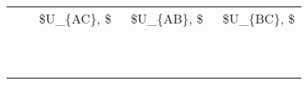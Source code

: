 \documentclass{article}
\begin{document}
\begin{table}[h!]
\begin{tabular}{llll}

\multicolumn{1}{p{114.4275pt}}{\centering } & \multicolumn{1}{p{70.76437pt}}{\centering \ \$U\_\{AC\}, \$ } & \multicolumn{1}{p{84.315pt}}{\centering \ \$U\_\{AB\}, \$ } & \multicolumn{1}{p{75.28125pt}}{\centering \ \$U\_\{BC\}, \$ }\\ 

\multicolumn{1}{p{114.4275pt}}{\centering \ } & \multicolumn{1}{p{70.76437pt}}{} & \multicolumn{1}{p{84.315pt}}{} & \multicolumn{1}{p{75.28125pt}}{}\\ 

\multicolumn{1}{p{114.4275pt}}{\centering \ } & \multicolumn{1}{p{70.76437pt}}{} & \multicolumn{1}{p{84.315pt}}{} & \multicolumn{1}{p{75.28125pt}}{}\\ 


\end{tabular}
\end{table}
\end{document}
